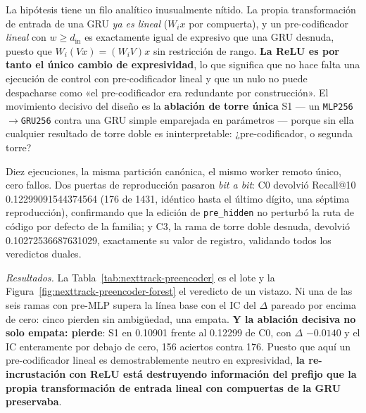 \documentclass[11pt]{article}
\begin{document}
La hipótesis tiene un filo analítico inusualmente nítido. La propia
transformación de entrada de una GRU \emph{ya es lineal} ($W_i x$ por compuerta),
y un pre-codificador \emph{lineal} con $w \ge d_{\text{in}}$ es exactamente igual
de expresivo que una GRU desnuda, puesto que $W_i(Vx) = (W_iV)x$ sin restricción
de rango. \textbf{La ReLU es por tanto el único cambio de expresividad}, lo que
significa que no hace falta una ejecución de control con pre-codificador lineal y
que un nulo no puede despacharse como «el pre-codificador era redundante por
construcción». El movimiento decisivo del diseño es la \textbf{ablación de torre
única} S1 --- un \texttt{MLP256}$\to$\texttt{GRU256} contra una GRU simple
emparejada en parámetros --- porque sin ella cualquier resultado de torre doble
es ininterpretable: ¿pre-codificador, o segunda torre?

Diez ejecuciones, la misma partición canónica, el mismo worker remoto único, cero
fallos. Dos puertas de reproducción pasaron \emph{bit a bit}: C0 devolvió
Recall@10 \num{0.12299091544374564} (\num{176} de \num{1431}, idéntico hasta el
último dígito, una séptima reproducción), confirmando que la edición de
\texttt{pre\_hidden} no perturbó la ruta de código por defecto de la familia; y
C3, la rama de torre doble desnuda, devolvió \num{0.10272536687631029},
exactamente su valor de registro, validando todos los veredictos duales.

\emph{Resultados.} La Tabla~\ref{tab:nexttrack-preencoder} es el lote y la
Figura~\ref{fig:nexttrack-preencoder-forest} el veredicto de un vistazo. Ni una
de las seis ramas con pre-MLP supera la línea base con el IC del $\Delta$ pareado
por encima de cero: cinco pierden sin ambigüedad, una empata. \textbf{Y la
ablación decisiva no solo empata: pierde}: S1 en \num{0.10901} frente al
\num{0.12299} de C0, con $\Delta$ $-\num{0.0140}$ y el IC enteramente por debajo
de cero, \num{156} aciertos contra \num{176}. Puesto que aquí un
pre-codificador lineal es demostrablemente neutro en expresividad, \textbf{la
re-incrustación con ReLU está destruyendo información del prefijo que la propia
transformación de entrada lineal con compuertas de la GRU preservaba}.
\end{document}

